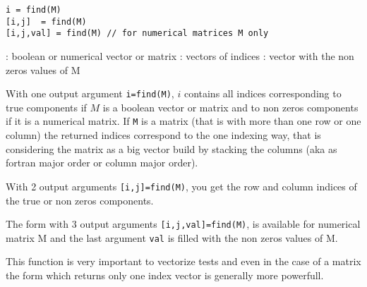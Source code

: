 
\begin{mandesc}
\end{mandesc}

\begin{calling_sequence}
\begin{verbatim}
i = find(M)
[i,j]  = find(M)
[i,j,val] = find(M) // for numerical matrices M only
\end{verbatim}
\end{calling_sequence}
\begin{parameters}
  \begin{varlist}
    :  boolean or  numerical vector or matrix
    : vectors of indices
    : vector with the non zeros values of M
  \end{varlist}
\end{parameters}

\begin{mandescription}
With one output argument \verb+i=find(M)+,  $i$ contains all indices 
corresponding to true components if $M$ is a boolean vector or matrix 
and to non zeros components if it is a numerical matrix. If \verb+M+
is a matrix (that is with more than one row or one
column) the returned indices correspond to the one indexing way, 
that is considering the matrix as a big vector build by stacking 
the columns (aka as fortran major order or column major order).

With 2 output arguments \verb+[i,j]=find(M)+,
you get the  row and column indices of the true or non zeros components.

The form with 3 output arguments \verb+[i,j,val]=find(M)+, is available
for numerical matrix M and the last argument \verb+val+ is filled with
the non zeros values of M.
 

This function is very important to vectorize tests and even in the 
case of a matrix the form which returns only one 
index vector is generally more powerfull.
\end{mandescription}

